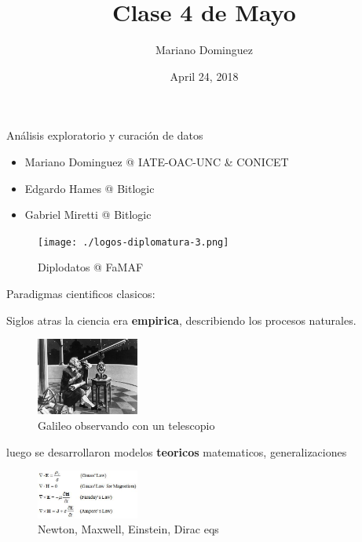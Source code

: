 \documentclass[ignorenonframetext,]{beamer}
\title{Clase 4 de Mayo}
\author{Mariano Dominguez}
\date{April 24, 2018}
\providecommand{\tightlist}{%
  \setlength{\itemsep}{0pt}\setlength{\parskip}{0pt}}
\begin{document}
\frame{\titlepage}

\begin{frame}{Análisis exploratorio y curación de datos}

\begin{itemize}
\tightlist
\item
  Mariano Dominguez @ IATE-OAC-UNC \& CONICET
\item
  Edgardo Hames @ Bitlogic
\item
  Gabriel Miretti @ Bitlogic
\end{itemize}

\begin{figure}
\centering
\texttt{[image: ./logos-diplomatura-3.png]}
\caption{Diplodatos @ FaMAF}
\end{figure}

\end{frame}

\begin{frame}{Paradigmas cientificos clasicos:}

Siglos atras la ciencia era \textbf{empirica}, describiendo los procesos
naturales.

\begin{figure}
\centering
\includegraphics[width=0.30000\textwidth]{./13693233.jpg}
\caption{Galileo observando con un telescopio}
\end{figure}

luego se desarrollaron modelos \textbf{teoricos} matematicos,
generalizaciones

\begin{figure}
\centering
\includegraphics[width=0.30000\textwidth]{./maxwellseq.jpg}
\caption{Newton, Maxwell, Einstein, Dirac eqs}
\end{figure}

\end{frame}
\end{document}
